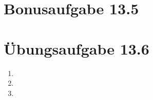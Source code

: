 \documentclass[a4paper]{scrartcl}
\begin{document}
\section*{Bonusaufgabe 13.5} 

\section*{Übungsaufgabe 13.6} 

\begin{enumerate}
    \item

    \item

    \item

\end{enumerate}
\end{document}
